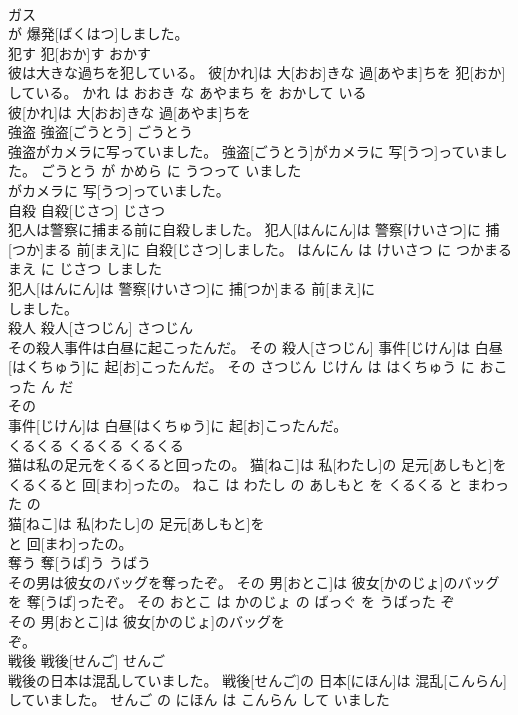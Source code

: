 \documentclass[8pt]{extreport}
\begin{document}
\begin{CJK}{UTF8}{min}
\\	ガス
\\	が 爆発[ばくはつ]しました。			
\\	犯す	犯[おか]す	おかす	
\\	彼は大きな過ちを犯している。	彼[かれ]は 大[おお]きな 過[あやま]ちを 犯[おか]している。	かれ は おおき な あやまち を おかして いる	
\\	彼[かれ]は 大[おお]きな 過[あやま]ちを
\\	強盗	強盗[ごうとう]	ごうとう	
\\	強盗がカメラに写っていました。	強盗[ごうとう]がカメラに 写[うつ]っていました。	ごうとう が かめら に うつって いました	
\\	がカメラに 写[うつ]っていました。			
\\	自殺	自殺[じさつ]	じさつ	
\\	犯人は警察に捕まる前に自殺しました。	犯人[はんにん]は 警察[けいさつ]に 捕[つか]まる 前[まえ]に 自殺[じさつ]しました。	はんにん は けいさつ に つかまる まえ に じさつ しました	
\\	犯人[はんにん]は 警察[けいさつ]に 捕[つか]まる 前[まえ]に
\\	しました。			
\\	殺人	殺人[さつじん]	さつじん	
\\	その殺人事件は白昼に起こったんだ。	その 殺人[さつじん] 事件[じけん]は 白昼[はくちゅう]に 起[お]こったんだ。	その さつじん じけん は はくちゅう に おこった ん だ	
\\	その
\\	事件[じけん]は 白昼[はくちゅう]に 起[お]こったんだ。			
\\	くるくる	くるくる	くるくる	
\\	猫は私の足元をくるくると回ったの。	猫[ねこ]は 私[わたし]の 足元[あしもと]をくるくると 回[まわ]ったの。	ねこ は わたし の あしもと を くるくる と まわった の	
\\	猫[ねこ]は 私[わたし]の 足元[あしもと]を
\\	と 回[まわ]ったの。			
\\	奪う	奪[うば]う	うばう	
\\	その男は彼女のバッグを奪ったぞ。	その 男[おとこ]は 彼女[かのじょ]のバッグを 奪[うば]ったぞ。	その おとこ は かのじょ の ばっぐ を うばった ぞ	
\\	その 男[おとこ]は 彼女[かのじょ]のバッグを
\\	ぞ。			
\\	戦後	戦後[せんご]	せんご	
\\	戦後の日本は混乱していました。	戦後[せんご]の 日本[にほん]は 混乱[こんらん]していました。	せんご の にほん は こんらん して いました	

\end{CJK}
\end{document}
